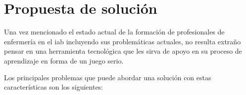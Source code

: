 
\section{Propuesta de solución}

%

Una vez mencionado el estado actual de la formación de profesionales de
enfermería en el \Gls{iab} incluyendo sus problemáticas actuales, no resulta
extraño pensar en una herramienta tecnológica que les sirva de apoyo en su
proceso de aprendizaje en forma de un juego serio.

Los principales problemas que puede abordar una solución con estas
características son los siguientes:

